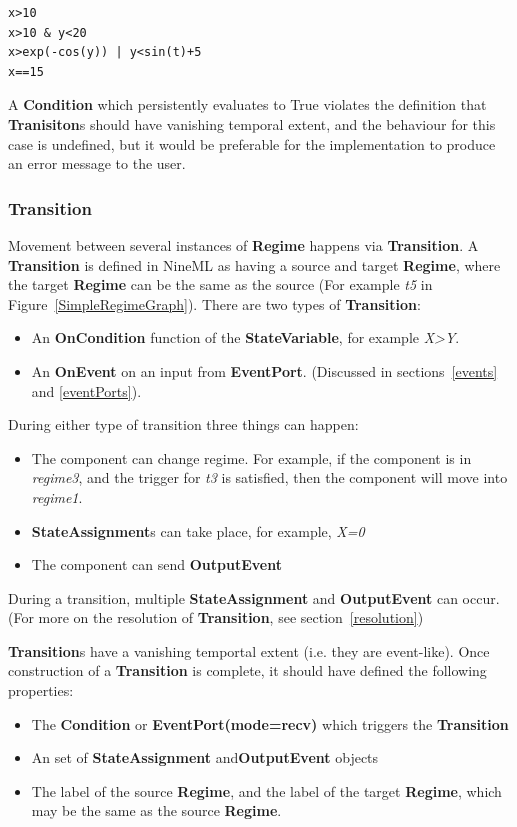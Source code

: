 \documentclass{article}
\newcommand{\nmlClass}[1]{{\bf #1}}
\newcommand{\StateVariable}{{\bf{StateVariable}}\xspace}
\newcommand{\StateAssignment}{{\bf{StateAssignment}}\xspace}
\newcommand{\EventPort}{{\bf{EventPort}}\xspace}
\newcommand{\Regime}{{\bf{Regime}}\xspace}
\newcommand{\Transition}{{\bf{Transition}}\xspace}
\newcommand{\OnEvent}{{\bf{OnEvent}}\xspace}
\newcommand{\OnCondition}{{\bf{OnCondition}}\xspace}
\newcommand{\OutputEvent}{{\bf{OutputEvent}}\xspace}
\begin{document}
\begin{verbatim}
x>10
x>10 & y<20
x>exp(-cos(y)) | y<sin(t)+5
x==15
\end{verbatim}

A \nmlClass{Condition} which persistently evaluates to True
violates the definition that \nmlClass{Tranisiton}s should have vanishing
temporal extent, and the behaviour for this case is undefined, but
it would be preferable for the implementation to produce an error
message to the user.

\subsubsection{Transition}

Movement between several instances of \Regime happens via \Transition. A \nmlClass{Transition} is defined in NineML as having
a source and target \nmlClass{Regime}, where the target
\nmlClass{Regime} can be the same as the source (For example \emph{t5}
in Figure~\ref{SimpleRegimeGraph}). There are two types of \Transition:

\begin{itemize}
\item An \OnCondition function of the \StateVariable, for
example \textsl{X>Y}.
\item An \OnEvent on an input from \EventPort. (Discussed in
sections~\ref{events} and \ref{eventPorts}).
\end{itemize}

During either type of transition three things can happen:
\begin{itemize}
\item The component can change regime. For example, if
the component is in \emph{regime3}, and the trigger for \emph{t3} is
satisfied, then the component will move into \emph{regime1}.
\item \textbf{StateAssignment}s can take place, for example, \textsl{X=0}
\item The component can send \OutputEvent
\end{itemize}

During a transition, multiple \StateAssignment and \OutputEvent can occur. 
(For more on the resolution of \Transition, see section~\ref{resolution})

\nmlClass{Transition}s have a vanishing temportal extent (i.e. they are
event-like). Once construction of a \nmlClass{Transition} is complete, it
should have defined the following properties:
\begin{itemize}
\item The \nmlClass{Condition} or \nmlClass{EventPort(mode=recv)} which
triggers the \nmlClass{Transition}
\item An set of \StateAssignment and\OutputEvent objects
\item The label of the source \nmlClass{Regime}, and the label of the target
\nmlClass{Regime}, which may be the same as the source \nmlClass{Regime}.
\end{itemize}
\end{document}

